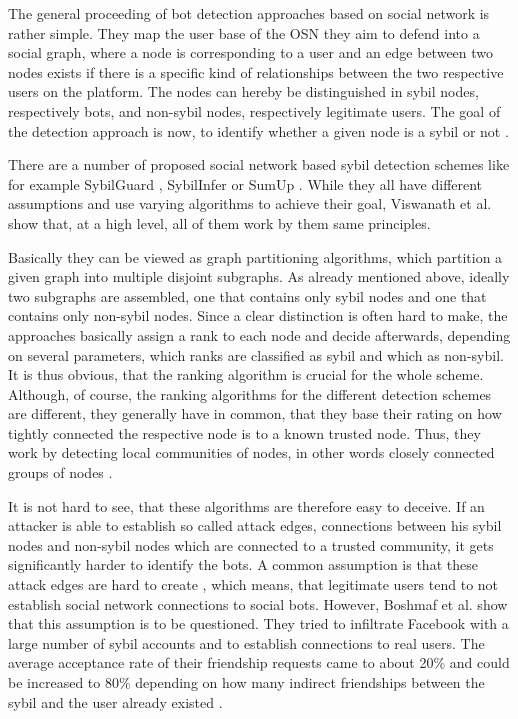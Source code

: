 The general proceeding of bot detection approaches based on social network is rather simple. They map the user base of the OSN they aim to defend into a social graph, where a node is corresponding to a user and an edge between two nodes exists if there is a specific kind of relationships between the two respective users on the platform. The nodes can hereby be distinguished in sybil nodes, respectively bots, and non-sybil nodes, respectively legitimate users. The goal of the detection approach is now, to identify whether a given node is a sybil or not \cite{comparison}.

There are a number of proposed social network based sybil detection schemes like for example SybilGuard \cite{sybilguard}, SybilInfer \cite{sybilinfer} or SumUp \cite{sumup}. While they all have different assumptions and use varying algorithms to achieve their goal, Viswanath et al. \cite{comparison} show that, at a high level, all of them work by them same principles.

Basically they can be viewed as graph partitioning algorithms, which partition a given graph into multiple disjoint subgraphs. As already mentioned above, ideally two subgraphs are assembled, one that contains only sybil nodes and one that contains only non-sybil nodes. Since a clear distinction is often hard to make, the approaches basically assign a rank to each node and decide afterwards, depending on several parameters, which ranks are classified as sybil and which as non-sybil. It is thus obvious, that the ranking algorithm is crucial for the whole scheme. Although, of course, the ranking algorithms for the different detection schemes are different, they generally have in common, that they base their rating on how tightly connected the respective node is to a known trusted node. Thus, they work by detecting local communities of nodes, in other words closely connected groups of nodes \cite{comparison}.

It is not hard to see, that these algorithms are therefore easy to deceive. If an attacker is able to establish so called attack edges, connections between his sybil nodes and non-sybil nodes which are connected to a trusted community, it gets significantly harder to identify the bots. A common assumption is that these attack edges are hard to create \cite{sybilguard}, which means, that legitimate users tend to not establish social network connections to social bots. However, Boshmaf et al. show \cite{boshmaf11} that this assumption is to be questioned. 
They tried to infiltrate Facebook with a large number of sybil accounts and to establish connections to real users. The average acceptance rate of their friendship requests came to about 20\% and could be increased to 80\% depending on how many indirect friendships between the sybil and the user already existed \cite{boshmaf11}.

